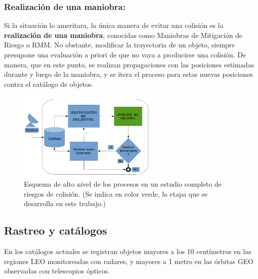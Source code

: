 \subsubsection*{Realizaci\'on de una maniobra:}
Si la situaci\'on lo ameritara, la \'unica manera de evitar una colisi\'on es la {\bf{realizaci\'on de una maniobra}}, conocidas como Maniobras de Mitigaci\'on de Riesgo o \ac{RMM}. No obstante, modificar la trayectoria de un objeto, siempre presupone una evaluaci\'on a priori de que no vaya a producirse una colisi\'on. De manera, que en este punto, se realizan propagaciones con las posiciones estimadas durante y luego de la maniobra, y se itera el proceso para estas nuevas posiciones contra el cat\'alogo de objetos.\\ 



\begin{figure}[!h]
  \centering
  \includegraphics[width=0.6\textwidth]{imagenes/estudiocolision}
  \caption[Estudio de Colisi\'on]{Esquema de alto nivel de los procesos en un estudio completo de riesgos de colisi\'on. (Se indica en color verde, la etapa que se desarrolla en este trabajo.)}
  \label{fig:estudiocolision}
\end{figure}



\subsection{Rastreo y cat\'alogos}\label{subsec:redes}

En los catálogos actuales se registran objetos mayores a los 10 cent\'imetros en las regiones LEO monitoreadas con radares, y mayores a 1 metro en las \'orbitas \ac{GEO} observadas con telescopios \'opticos.\\
 
